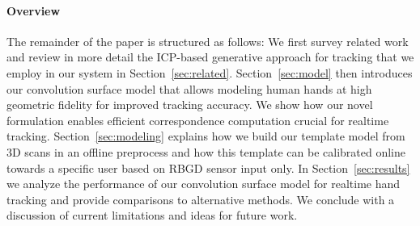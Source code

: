 \paragraph{Overview}
The remainder of the paper is structured as follows: We first survey related work and review in more detail the ICP-based generative approach for tracking that we employ in our system in Section~\ref{sec:related}.
Section~\ref{sec:model} then introduces our convolution surface model that allows modeling human hands at high geometric fidelity for improved tracking accuracy. We show how our novel formulation enables efficient correspondence computation crucial for realtime tracking.
Section~\ref{sec:modeling} explains how we build our template model from 3D scans in an offline preprocess and how this template can be calibrated online towards a specific user based on RBGD sensor input only.
In Section~\ref{sec:results} we analyze the performance of our convolution surface model for realtime hand tracking and provide comparisons to alternative methods. We conclude with a discussion of current limitations and ideas for future work.



